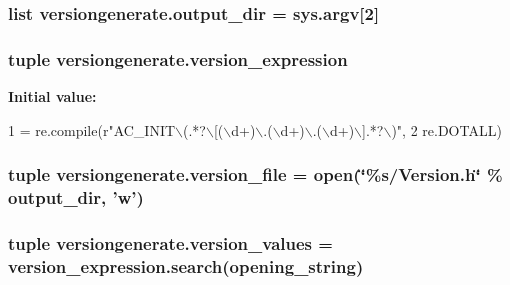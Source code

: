 \hypertarget{namespaceversiongenerate_a66aeb3b9df50fe61aa16e436b75f5a9a}{
\subsubsection[{output\-\_\-dir}]{\setlength{\rightskip}{0pt plus 5cm}list versiongenerate.\-output\-\_\-dir = sys.\-argv\mbox{[}2\mbox{]}}}\label{namespaceversiongenerate_a66aeb3b9df50fe61aa16e436b75f5a9a}
\hypertarget{namespaceversiongenerate_a7f509e15e9ef2fe82d5fad077a0f901c}{
\subsubsection[{version\-\_\-expression}]{\setlength{\rightskip}{0pt plus 5cm}tuple versiongenerate.\-version\-\_\-expression}}\label{namespaceversiongenerate_a7f509e15e9ef2fe82d5fad077a0f901c}
{\bfseries Initial value\-:}
\begin{DoxyCode}
1 = re.compile(\textcolor{stringliteral}{r"AC\_INIT\(\backslash\)(.*?\(\backslash\)[(\(\backslash\)d+)\(\backslash\).(\(\backslash\)d+)\(\backslash\).(\(\backslash\)d+)\(\backslash\)].*?\(\backslash\))"},
2                                 re.DOTALL)
\end{DoxyCode}
\hypertarget{namespaceversiongenerate_af3ac1aa2af0e761691fdda9a58f461a4}{
\subsubsection[{version\-\_\-file}]{\setlength{\rightskip}{0pt plus 5cm}tuple versiongenerate.\-version\-\_\-file = open(\char`\"{}\%s/Version.\-h\char`\"{} \% output\-\_\-dir, 'w')}}\label{namespaceversiongenerate_af3ac1aa2af0e761691fdda9a58f461a4}
\hypertarget{namespaceversiongenerate_aec88e2b4a2964885f9e88c055cc0cf69}{
\subsubsection[{version\-\_\-values}]{\setlength{\rightskip}{0pt plus 5cm}tuple versiongenerate.\-version\-\_\-values = version\-\_\-expression.\-search({\bf opening\-\_\-string})}}\label{namespaceversiongenerate_aec88e2b4a2964885f9e88c055cc0cf69}

